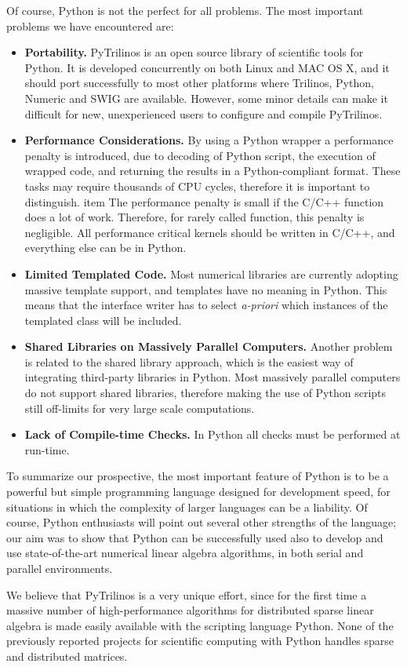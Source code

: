 \documentclass[10pt,relax]{SANDreport}
\begin{document}
\smallskip

Of course, Python is not the perfect for
all problems. The most important problems we have encountered are:
\begin{itemize}
\item {\bf Portability.} PyTrilinos is an open source library of scientific
  tools for Python.  It is developed concurrently on both Linux and MAC OS X,
  and it should port successfully to most other platforms where Trilinos,
  Python, Numeric and SWIG are available. However, some minor details can make
  it difficult for new, unexperienced users to configure and compile
  PyTrilinos.
%
\item {\bf Performance Considerations.}
By using a Python wrapper a performance penalty is introduced, due to
decoding of Python script, the execution of wrapped code, and returning the
results in a Python-compliant format. These tasks may require thousands of CPU
cycles, therefore it is important to distinguish.
item The performance penalty is small if the C/C++ function does a lot of work.
Therefore, for rarely called function, this penalty is negligible.
All performance critical kernels should be written in C/C++, and
everything else can be in Python.
%
\item {\bf Limited Templated Code.} Most numerical
libraries are currently adopting massive template support, and templates have
no meaning in Python. This means that the interface writer has to select {\sl
  a-priori} which instances of the templated class will be included.
%
\item {\bf Shared Libraries on Massively Parallel Computers.} Another problem
is related to the shared library approach, which is the easiest way of
integrating third-party libraries in Python. Most massively parallel
computers do not support shared libraries, therefore making the use of Python
scripts still off-limits for very large scale computations.
%
\item {\bf Lack of Compile-time Checks.} In Python all checks must be
performed at run-time.
\end{itemize}

\smallskip

To summarize our prospective, the most important feature of Python is to be a
powerful but simple programming language designed for development speed, for
situations in which the complexity of larger languages can be a liability. Of
course, Python enthusiasts will point out several other strengths of the
language; our aim was to show that Python can be successfully used also to
develop and use state-of-the-art numerical linear algebra algorithms, in both
serial and parallel environments. 

We believe that PyTrilinos is a very unique effort, since for the first time a
massive number of high-performance algorithms for distributed sparse linear
algebra is made easily available with the scripting language Python.  None of
the previously reported projects for scientific computing with Python handles
sparse and distributed matrices. 



\end{document}
